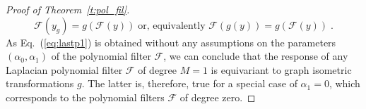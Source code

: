 \documentclass[10pt,journal,compsoc]{IEEEtran}
\begin{document}
\begin{proof}[Proof of Theorem~\ref{t:pol_fil}]
		\begin{equation}
		\mathcal{F}(y_g) = g \left(\mathcal{F}(y) \right)\; \text{or, equivalently }	\mathcal{F}\left(g(y) \right) = g \left(\mathcal{F}(y) \right)\; .
		\label{eq:lastp1}
		\end{equation} 
		\noindent
		As Eq.~(\ref{eq:lastp1}) is obtained without any assumptions on the parameters $(\alpha_0, \alpha_1)$ of the polynomial filter $\mathcal{F}$, we can conclude that the response of any Laplacian polynomial filter $\mathcal{F}$ of degree $M=1$ is equivariant to graph isometric transformations $g$. The latter is, therefore, true for a special case of $\alpha_1 = 0$, which corresponds to the polynomial filters $\mathcal{F}$ of degree zero.
		

\end{proof}
\end{document}
